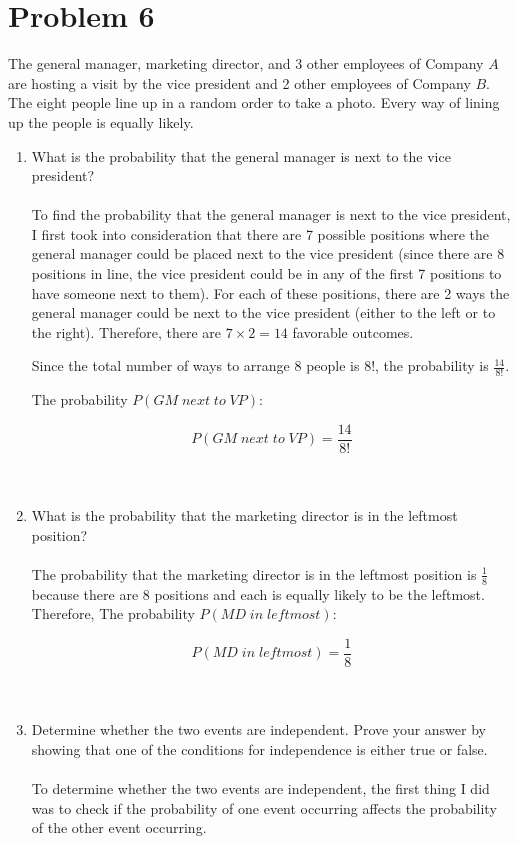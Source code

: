 \documentclass{amsart}
\theoremstyle{definition}
\theoremstyle{Exercise}
\theoremstyle{remark}
\theoremstyle{rule}
\numberwithin{equation}{section}
\begin{document}
  \section*{Problem 6}
The general manager, marketing director, and 3 other employees of Company $A$ are hosting a visit by the vice president and 2 other employees of Company $B$. The eight people line up in a random order to take a photo. Every way of lining up the people is equally likely.
\begin{enumerate}[label=(\alph*)]
  \item What is the probability that the general manager is next to the vice president?
\\\\
To find the probability that the general manager is next to the vice president, I first took into consideration that there are 7 possible positions where the general manager could be placed next to the vice president (since there are 8 positions in line, the vice president could be in any of the first 7 positions to have someone next to them). For each of these positions, there are 2 ways the general manager could be next to the vice president (either to the left or to the right). Therefore, there are \(7 \times 2 = 14\) favorable outcomes.

Since the total number of ways to arrange 8 people is \(8!\), the probability is \( \frac{14}{8!} \).

The probability \( P(GM \; next \; to \; VP) \):

\[ P(GM \; next \; to \; VP) = \frac{14}{8!} \]
\\\\
  \item What is the probability that the marketing director is in the leftmost position?
\\\\
The probability that the marketing director is in the leftmost position is \( \frac{1}{8} \) because there are 8 positions and each is equally likely to be the leftmost. Therefore, The probability \( P(MD \; in \; leftmost) \):

\[ P(MD \; in \; leftmost) = \frac{1}{8} \]
\\\\
  \item Determine whether the two events are independent. Prove your answer by showing that one of the conditions for independence is either true or false.
 \\\\
To determine whether the two events are independent, the first thing I did was to check if the probability of one event occurring affects the probability of the other event occurring. 


\end{enumerate}
\end{document}
